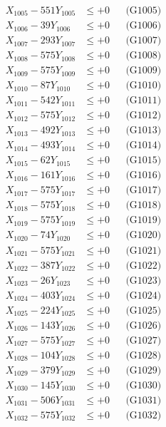 \documentclass[a4paper,10pt]{article}
\begin{document}
{\begin{align}
X_{1005} - 551Y_{1005} &\leq +0 && \text{(G1005)} \\
X_{1006} - 39Y_{1006} &\leq +0 && \text{(G1006)} \\
X_{1007} - 293Y_{1007} &\leq +0 && \text{(G1007)} \\
X_{1008} - 575Y_{1008} &\leq +0 && \text{(G1008)} \\
X_{1009} - 575Y_{1009} &\leq +0 && \text{(G1009)} \\
X_{1010} - 87Y_{1010} &\leq +0 && \text{(G1010)} \\
\allowbreak
X_{1011} - 542Y_{1011} &\leq +0 && \text{(G1011)} \\
X_{1012} - 575Y_{1012} &\leq +0 && \text{(G1012)} \\
X_{1013} - 492Y_{1013} &\leq +0 && \text{(G1013)} \\
X_{1014} - 493Y_{1014} &\leq +0 && \text{(G1014)} \\
X_{1015} - 62Y_{1015} &\leq +0 && \text{(G1015)} \\
X_{1016} - 161Y_{1016} &\leq +0 && \text{(G1016)} \\
X_{1017} - 575Y_{1017} &\leq +0 && \text{(G1017)} \\
X_{1018} - 575Y_{1018} &\leq +0 && \text{(G1018)} \\
X_{1019} - 575Y_{1019} &\leq +0 && \text{(G1019)} \\
X_{1020} - 74Y_{1020} &\leq +0 && \text{(G1020)} \\
\allowbreak
X_{1021} - 575Y_{1021} &\leq +0 && \text{(G1021)} \\
X_{1022} - 387Y_{1022} &\leq +0 && \text{(G1022)} \\
X_{1023} - 26Y_{1023} &\leq +0 && \text{(G1023)} \\
X_{1024} - 403Y_{1024} &\leq +0 && \text{(G1024)} \\
X_{1025} - 224Y_{1025} &\leq +0 && \text{(G1025)} \\
X_{1026} - 143Y_{1026} &\leq +0 && \text{(G1026)} \\
X_{1027} - 575Y_{1027} &\leq +0 && \text{(G1027)} \\
X_{1028} - 104Y_{1028} &\leq +0 && \text{(G1028)} \\
X_{1029} - 379Y_{1029} &\leq +0 && \text{(G1029)} \\
X_{1030} - 145Y_{1030} &\leq +0 && \text{(G1030)} \\
\allowbreak
X_{1031} - 506Y_{1031} &\leq +0 && \text{(G1031)} \\
X_{1032} - 575Y_{1032} &\leq +0 && \text{(G1032)} \\

\end{align}}
\end{document}
